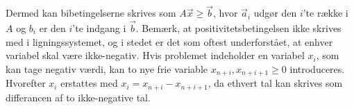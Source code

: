
Dermed kan bibetingelserne skrives som $A\vec{x}\geq \vec{b}$, hvor $\vec{a}_i$ udgør den $i$'te række i $A$ og $b_i$ er den $i$'te indgang i $\vec{b}$.
Bemærk, at positivitetsbetingelsen ikke skrives med i ligningssystemet, og i stedet er det som oftest underforstået, at enhver variabel skal være ikke-negativ.
Hvis problemet indeholder en variabel $x_i$, som kan tage negativ værdi, kan to nye frie variable $x_{n+i}, x_{n+i+1} \geq 0$ introduceres.
Hvorefter $x_i$ erstattes med $x_i = x_{n+i}-x_{n+i+1}$, da ethvert tal kan skrives som differancen af to ikke-negative tal. 




\begin{comment}
Derved bliver betingelserne for henholdsvis et maksimeringsproblem og et minimeringsproblem omskrevet til:
\begin{align*}
	A' &=\rvect{A & I_m}\\
	A' &=\rvect{A & -I_m}
\end{align*}


Man må vel ikke bare sige at $x_1 \geq 0$, men man skal sige at $x_1 = x_3 - x_4$, hvor $x_3, x_4 \geq 0$.
\end{comment}